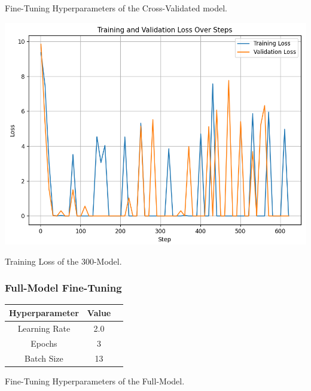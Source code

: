 \documentclass[10pt,twocolumn,letterpaper]{article}
\begin{document}
\begin{center}
    \small {Fine-Tuning Hyperparameters of the Cross-Validated model.} \\
\end{center} 

\begin{center}
\includegraphics*[scale=0.40]{img/300.png} 
\end{center}

\begin{center}
    \small {Training Loss of the 300-Model.}
\end{center}

\subsubsection*{Full-Model Fine-Tuning}

\begin{center}

    \begin{tabular}{ccc}
        \toprule
        Hyperparameter & Value \\
        \midrule
        Learning Rate & 2.0 \\
        Epochs & 3 \\
        Batch Size & 13 \\
        \bottomrule
    \end{tabular} 
\end{center} 

\begin{center}
    \small {Fine-Tuning Hyperparameters of the Full-Model.} 
\end{center}
\end{document}

